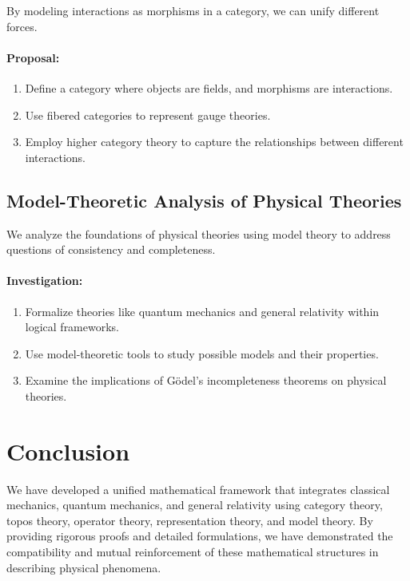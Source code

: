 \documentclass[12pt]{article}
\begin{document}
By modeling interactions as morphisms in a category, we can unify different forces.

\paragraph{Proposal:}
\begin{enumerate}[label=\arabic*.]
    \item Define a category where objects are fields, and morphisms are interactions.
    \item Use fibered categories to represent gauge theories.
    \item Employ higher category theory to capture the relationships between different interactions.
\end{enumerate}

\subsection{Model-Theoretic Analysis of Physical Theories}

We analyze the foundations of physical theories using model theory to address questions of consistency and completeness.

\paragraph{Investigation:}
\begin{enumerate}[label=\arabic*.]
    \item Formalize theories like quantum mechanics and general relativity within logical frameworks.
    \item Use model-theoretic tools to study possible models and their properties.
    \item Examine the implications of Gödel's incompleteness theorems on physical theories.
\end{enumerate}

\section{Conclusion}

We have developed a unified mathematical framework that integrates classical mechanics, quantum mechanics, and general relativity using category theory, topos theory, operator theory, representation theory, and model theory. By providing rigorous proofs and detailed formulations, we have demonstrated the compatibility and mutual reinforcement of these mathematical structures in describing physical phenomena.
\end{document}
